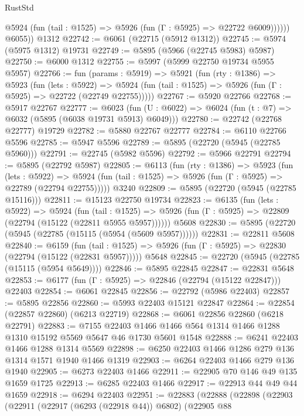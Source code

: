 \begin{lexlean}{RustStd}
\begin{coremodule}
{{              @5924 (fun (tail : @1525) => @5926 (fun (Γ : @5925) => @22722 @6009))))))
        @6055))
    @1312
@22742 := @6061 (@22715 (@5912 @1312))
@22745 := @5974 (@5975 @1312) @19731
@22749 := @5895 (@5966 (@22745 @5983) @5987)
@22750 := @6000 @1312
@22755 := @5997 (@5999 @22750 @19734 @5955 @5957)
@22766 := fun (params : @5919) =>
  @5921
    (fun (rty : @1386) =>
    @5923
      (fun (lets : @5922) =>
      @5924 (fun (tail : @1525) => @5926 (fun (Γ : @5925) => @22722 (@22749 @22755)))))
@22767 := @5920 @22766
@22768 := @5917 @22767
@22777 := @6023
    (fun (U : @6022) => @6024 (fun (t : @7) => @6032 (@5895 (@6038 @19731 @5913) @6049)))
@22780 := @22742 (@22768 @22777) @19729
@22782 := @5880 @22767 @22777
@22784 := @6110 @22766 @5596
@22785 := @5947 @5596
@22789 := @5895 (@22720 (@5945 (@22785 @5960)))
@22791 := @22745 (@5982 @5596)
@22792 := @5966 @22791
@22794 := @5895 (@22792 @5987)
@22805 := @6113
    (fun (rty : @1386) =>
    @5923
      (fun (lets : @5922) =>
      @5924 (fun (tail : @1525) => @5926 (fun (Γ : @5925) => @22789 (@22794 @22755)))))
    @3240
@22809 := @5895 (@22720 (@5945 (@22785 @15116)))
@22811 := @15123 @22750 @19734
@22823 := @6135
    (fun (lets : @5922) =>
    @5924
      (fun (tail : @1525) =>
      @5926 (fun (Γ : @5925) => @22809 (@22794 (@15122 (@22811 @5955 @5957))))))
    @5608
@22830 := @5895 (@22720 (@5945 (@22785 (@15115 (@5954 (@5609 @5957))))))
@22831 := @22811 @5608
@22840 := @6159
    (fun (tail : @1525) => @5926 (fun (Γ : @5925) => @22830 (@22794 (@15122 (@22831 @5957)))))
    @5648
@22845 := @22720 (@5945 (@22785 (@15115 (@5954 @5649))))
@22846 := @5895 @22845
@22847 := @22831 @5648
@22853 := @6177 (fun (Γ : @5925) => @22846 (@22794 (@15122 @22847))) @22403
@22854 := @6061 @22845
@22856 := @22792 (@5986 @22403)
@22857 := @5895 @22856
@22860 := @5993 @22403 @15121 @22847
@22864 := @22854 (@22857 @22860) (@6213 @22719)
@22868 := @6061 @22856 @22860 (@6218 @22791)
@22883 := @7155
    @22403
    @1466
    @1466
    @564
    @1314
    @1466
    @1288
    @1310
    @15192
    @5569
    @5647
    @46
    @1730
    @5601
    @1548
@22888 := @6241 @22403 @1466 @1288 @1314 @5569
@22898 := @6250 @22403 @1466 @1286 @279 @136 @1314 @1571 @1940 @1466 @1319
@22903 := @6264 @22403 @1466 @279 @136 @1940
@22905 := @6273 @22403 @1466
@22911 := @22905 @70 @146 @49 @135 @1659 @1725
@22913 := @6285 @22403 @1466
@22917 := @22913 @44 @49 @44 @1659
@22918 := @6294 @22403
@22951 := @22883
    (@22888
      (@22898
        (@22903
          (@22911
            (@22917 (@6293 (@22918 @44)) @6802)
            (@22905
              @88
}}
\end{coremodule}
\end{lexlean}
